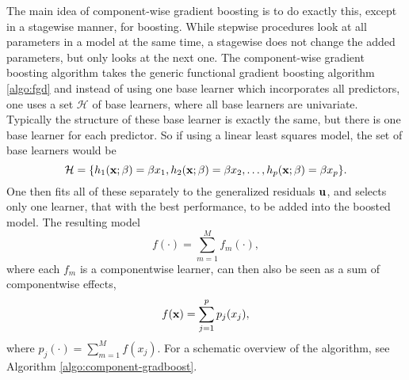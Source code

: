 The main idea of component-wise gradient boosting is to do exactly this, except in a stagewise manner, for boosting. While stepwise procedures look at all parameters in a model at the same time, a stagewise does not change the added parameters, but only looks at the next one.
The component-wise gradient boosting algorithm takes the generic functional gradient boosting algorithm \eqref{algo:fgd} and instead of using one base learner which incorporates all predictors, one uses a set $\mathcal{H}$ of base learners, where all base learners are univariate. Typically the structure of these base learner is exactly the same, but there is one base learner for each predictor. So if using a linear least squares model, the set of base learners would be
\begin{equation}
    \mathcal{H}=\{h_1(\mathbf{x};\beta)=\beta x_1,h_2(\mathbf{x};\beta)=\beta x_2,\ldots,h_p(\mathbf{x};\beta)=\beta x_p \}.
\end{equation}
One then fits all of these separately to the generalized residuals $\mathbf{u}$, and selects only one learner, that with the best performance, to be added into the boosted model. The resulting model
\begin{equation}
    f(\cdot)=\sum_{m=1}^Mf_m(\cdot),
\end{equation}
where each $f_m$ is a componentwise learner, can then also be seen as a sum of componentwise effects,
\begin{equation*}
    f(\mathbf{x})=\sum_{j=1}^p p_j(x_j),
\end{equation*}
where $p_j(\cdot)=\sum_{m=1}^M f(x_j)$. For a schematic overview of the algorithm, see Algorithm \ref{algo:component-gradboost}.
